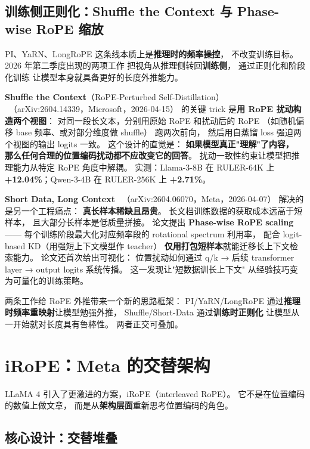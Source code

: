 \subsection{训练侧正则化：Shuffle the Context 与 Phase-wise RoPE 缩放}
\label{sec:rope-train-reg}

PI、YaRN、LongRoPE 这条线本质上是\textbf{推理时的频率操控}，
不改变训练目标。
2026 年第二季度出现的两项工作
把视角从推理侧转回\textbf{训练侧}，
通过正则化和阶段化训练
让模型本身就具备更好的长度外推能力。

\textbf{Shuffle the Context}（RoPE-Perturbed Self-Distillation）
~\cite{shuffle2026}（arXiv:2604.14339，Microsoft，2026-04-15）
的关键 trick 是\textbf{用 RoPE 扰动构造两个视图}：
对同一段长文本，分别用原始 RoPE 和扰动后的 RoPE
（如随机偏移 base 频率、或对部分维度做 shuffle）
跑两次前向，
然后用自蒸馏 loss 强迫两个视图的输出 logits 一致。
这个设计的直觉是：
\textbf{如果模型真正"理解"了内容，
那么任何合理的位置编码扰动都不应改变它的回答}。
扰动一致性约束让模型把推理能力从特定 RoPE 角度中解耦。
实测：Llama-3-8B 在 RULER-64K 上
\textbf{+12.04\%}；Qwen-3-4B 在 RULER-256K 上 \textbf{+2.71\%}。

\textbf{Short Data, Long Context}~\cite{shortdatalongctx2026}
（arXiv:2604.06070，Meta，2026-04-07）
解决的是另一个工程痛点：
\textbf{真长样本稀缺且昂贵}。
长文档训练数据的获取成本远高于短样本，
且大部分长样本是低质量拼接。
论文提出 \textbf{Phase-wise RoPE scaling}——
每个训练阶段最大化对应频率段的 rotational spectrum 利用率，
配合 logit-based KD（用强短上下文模型作 teacher）
\textbf{仅用打包短样本}就能迁移长上下文检索能力。
论文还首次给出可视化：
位置扰动如何通过 q/k → 后续 transformer layer
→ output logits 系统传播。
这一发现让"短数据训长上下文"
从经验技巧变为可量化的训练策略。

两条工作给 RoPE 外推带来一个新的思路框架：
PI/YaRN/LongRoPE 通过\textbf{推理时频率重映射}让模型勉强外推，
Shuffle/Short-Data 通过\textbf{训练时正则化}
让模型从一开始就对长度具有鲁棒性。
两者正交可叠加。

\section{iRoPE：Meta 的交替架构}

LLaMA 4 引入了更激进的方案，iRoPE（interleaved RoPE）。
它不是在位置编码的数值上做文章，
而是从\textbf{架构层面}重新思考位置编码的角色。

\subsection{核心设计：交替堆叠}

